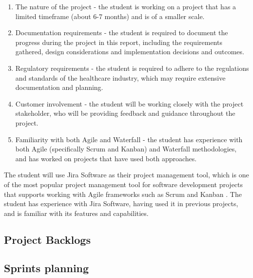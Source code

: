 \begin{enumerate}
    \item The nature of the project - the student is working on a project that has a limited timeframe (about 6-7 months) and is of a smaller scale. 
    \item Documentation requirements - the student is required to document the progress during the project in this report, including the requirements gathered, design considerations and implementation decisions and outcomes. 
    \item Regulatory requirements - the student is required to adhere to the regulations and standards of the healthcare industry, which may require extensive documentation and planning.
    \item Customer involvement - the student will be working closely with the project stakeholder, who will be providing feedback and guidance throughout the project.
    \item Familiarity with both Agile and Waterfall - the student has experience with both Agile (specifically Scrum and Kanban) and Waterfall methodologies, and has worked on projects that have used both approaches.
\end{enumerate}

The student will use Jira Software as their project management tool, which is one of the most popular project management tool for software development projects that supports working with Agile frameworks such as Scrum and Kanban \parencite{atlassian}. The student has experience with Jira Software, having used it in previous projects, and is familiar with its features and capabilities.

\subsection{Project Backlogs}

\subsection{Sprints planning}